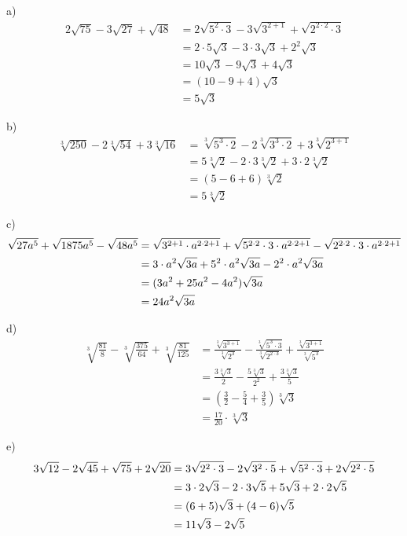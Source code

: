 \begin{solucio}
a)%
\begin{align*}
2\sqrt{75}-3\sqrt{27}+\sqrt{48} &=2\sqrt{5^{2}\cdot 3}-3\sqrt{3^{2+1}}+%
\sqrt{2^{2\cdot 2}\cdot 3} \\
&=2\cdot 5\sqrt{3}-3\cdot 3\sqrt{3}+2^{2}\sqrt{3} \\
&=10\sqrt{3}-9\sqrt{3}+4\sqrt{3} \\
&=(10-9+4)\sqrt{3} \\
&=5\sqrt{3}
\end{align*}

b)%
\begin{align*}
\sqrt[3]{250}-2\sqrt[3]{54}+3\sqrt[3]{16} &=\sqrt[3]{5^{3}\cdot 2}-2\sqrt[3]%
{3^{3}\cdot 2}+3\sqrt[3]{2^{3+1}} \\
&=5\sqrt[3]{2}-2\cdot 3\sqrt[3]{2}+3\cdot 2\sqrt[3]{2} \\
&=(5-6+6)\sqrt[3]{2} \\
&=5\sqrt[3]{2}
\end{align*}

c)%
\begin{align*}
\sqrt{27a^{5}}+\sqrt{1875a^{5}}-\sqrt{48a^{5}} &=\sqrt{3^{2+1}\cdot
a^{2\cdot 2+1}}+\sqrt{5^{2\cdot 2}\cdot 3\cdot a^{2\cdot 2+1}}-\sqrt{%
2^{2\cdot 2}\cdot 3\cdot a^{2\cdot 2+1}} \\
&=3\cdot a^{2}\sqrt{3a}+5^{2}\cdot a^{2}\sqrt{3a}-2^{2}\cdot a^{2}\sqrt{3a}
\\
&=(3a^{2}+25a^{2}-4a^{2})\sqrt{3a} \\
&=24a^{2}\sqrt{3a}
\end{align*}

d)%
\begin{align*}
\sqrt[3]{\frac{81}{8}}-\sqrt[3]{\frac{375}{64}}+\sqrt[3]{\frac{81}{125}} &=%
\frac{\sqrt[3]{3^{3+1}}}{\sqrt[3]{2^{3}}}-\frac{\sqrt[3]{5^{3}\cdot 3}}{\sqrt%
[3]{2^{2\cdot 3}}}+\frac{\sqrt[3]{3^{3+1}}}{\sqrt[3]{5^{3}}} \\
&=\frac{3\sqrt[3]{3}}{2}-\frac{5\sqrt[3]{3}}{2^{2}}+\frac{3\sqrt[3]{3}}{5}
\\
&=\left( \frac{3}{2}-\frac{5}{4}+\frac{3}{5}\right) \sqrt[3]{3} \\
&=\frac{17}{20}\cdot \sqrt[3]{3}
\end{align*}

e)%
\begin{align*}
3\sqrt{12}-2\sqrt{45}+\sqrt{75}+2\sqrt{20} &=3\sqrt{2^{2}\cdot 3}-2\sqrt{%
3^{2}\cdot 5}+\sqrt{5^{2}\cdot 3}+2\sqrt{2^{2}\cdot 5} \\
&=3\cdot 2\sqrt{3}-2\cdot 3\sqrt{5}+5\sqrt{3}+2\cdot 2\sqrt{5} \\
&=(6+5)\sqrt{3}+(4-6)\sqrt{5} \\
&=11\sqrt{3}-2\sqrt{5}
\end{align*}
\end{solucio}

